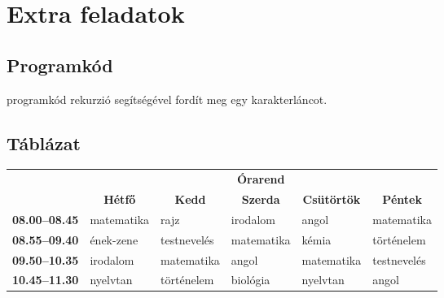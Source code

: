 \documentclass{thesis-ekf}
\theoremstyle{definition}
\theoremstyle{remark}
\begin{document}
\chapter{Extra feladatok}

\section{Programkód}


 programkód rekurzió segítségével fordít meg egy karakterláncot.

\section{Táblázat}

\begin{table}[h]
    \centering
    \footnotesize
    \begin{tabular}{|>{\bfseries}l|l|l|l|l|l|}
        \cline{2-6}
        \multicolumn{1}{c|}{} & \multicolumn{5}{c|}{\textbf{Órarend}}\\
        \cline{2-6}
        \multicolumn{1}{c|}{} &
        \multicolumn{1}{c|}{\textbf{Hétfő}} &
        \multicolumn{1}{c|}{\textbf{Kedd}} &
        \multicolumn{1}{c|}{\textbf{Szerda}} &
        \multicolumn{1}{c|}{\textbf{Csütörtök}} &
        \multicolumn{1}{c|}{\textbf{Péntek}} \\
        \hline
        08.00--08.45 & matematika & rajz & irodalom & angol & matematika\\
        \hline
        08.55--09.40 & ének-zene & testnevelés & matematika & kémia & történelem\\
        \hline
        09.50--10.35 & irodalom & matematika & angol & matematika & testnevelés\\
        \hline
        10.45--11.30 & nyelvtan & történelem & biológia & nyelvtan & angol\\
        \hline
    \end{tabular}
\end{table}

\begin{thebibliography}{2}
\end{thebibliography}


\end{document}
